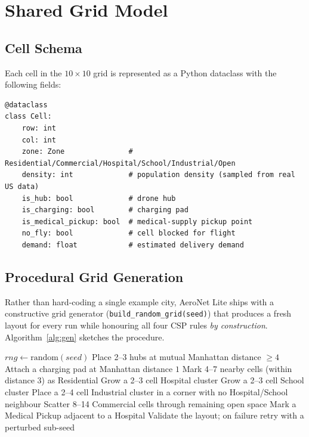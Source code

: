\documentclass[11pt,a4paper]{article}
\begin{document}
\section{Shared Grid Model}
\label{sec:grid}

\subsection{Cell Schema}
Each cell in the $10\!\times\!10$ grid is represented as a Python
dataclass with the following fields:
\begin{lstlisting}[style=py]
@dataclass
class Cell:
    row: int
    col: int
    zone: Zone               # Residential/Commercial/Hospital/School/Industrial/Open
    density: int             # population density (sampled from real US data)
    is_hub: bool             # drone hub
    is_charging: bool        # charging pad
    is_medical_pickup: bool  # medical-supply pickup point
    no_fly: bool             # cell blocked for flight
    demand: float            # estimated delivery demand
\end{lstlisting}

\subsection{Procedural Grid Generation}
Rather than hard-coding a single example city, AeroNet Lite ships with a
constructive grid generator (\texttt{build\_random\_grid(seed)}) that
produces a fresh layout for every run while honouring all four CSP rules
\emph{by construction}. Algorithm~\ref{alg:gen} sketches the procedure.

\begin{algorithm}[H]
\caption{\textsc{BuildRandomGrid}(seed)}
\label{alg:gen}
\begin{algorithmic}[1]
\State $rng \gets \text{random}(seed)$
\State Place 2--3 hubs at mutual Manhattan distance $\geq 4$
  \State Attach a charging pad at Manhattan distance $1$ 
\EndFor
{}
  \State Mark 4--7 nearby cells (within distance $3$) as Residential 
\EndFor
\State Grow a 2--3 cell Hospital cluster
\State Grow a 2--3 cell School cluster
\State Place a 2--4 cell Industrial cluster in a corner with no Hospital/School neighbour 
\State Scatter 8--14 Commercial cells through remaining open space
\State Mark a Medical Pickup adjacent to a Hospital 
\State Validate the layout; on failure retry with a perturbed sub-seed
\end{algorithmic}
\end{algorithm}
\end{document}

